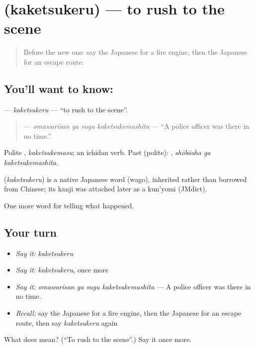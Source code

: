 \section[\texorpdfstring{\ja{かけつける} (kaketsukeru)}{かけつける (kaketsukeru)}]{ (kaketsukeru) — to rush to the scene}

\label{lesson:JA-C265-kaketsukeru}



\begin{quote}
Before the new one: say the Japanese for a fire engine, then the Japanese for an escape route.
\end{quote}

\subsection*{You'll want to know: }
\textbf{} — \emph{kaketsukeru} — \textquotedblleft{}to rush to the scene\textquotedblright{}.

\begin{quote}
\textbf{  } — \emph{omawarisan ga sugu kaketsukemashita} — \textquotedblleft{}A police officer was there in no time.\textquotedblright{}
\end{quote}

Polite \textbf{}, \emph{kaketsukemasu}; an ichidan verb. Past (polite): \textbf{ }, \emph{shōbōsha ga kaketsukemashita}.

\begin{cousinweb}
\textbf{} (\emph{kaketsukeru}) is a native Japanese word (wago), inherited rather than borrowed from Chinese; its kanji was attached later as a kun'yomi (JMdict).
\end{cousinweb}

\begin{grammarlens}[title={What you've built}]
One more word for telling what happened.
\end{grammarlens}

\subsection*{Your turn}
\begin{itemize}
\raggedright
  \item \emph{Say it:} \emph{kaketsukeru}
  \item \emph{Say it:} \emph{kaketsukeru}, once more
  \item \emph{Say it:} \emph{omawarisan ga sugu kaketsukemashita} — A police officer was there in no time.
  \item \emph{Recall:} say the Japanese for a fire engine, then the Japanese for an escape route, then say \emph{kaketsukeru} again
\end{itemize}

\begin{tcolorbox}[breakable,colback=teal!4,colframe=teal!35!black,title={Before you move on}]
What does  mean? (\textquotedblleft{}To rush to the scene\textquotedblright{}.) Say it once more.
\end{tcolorbox}
